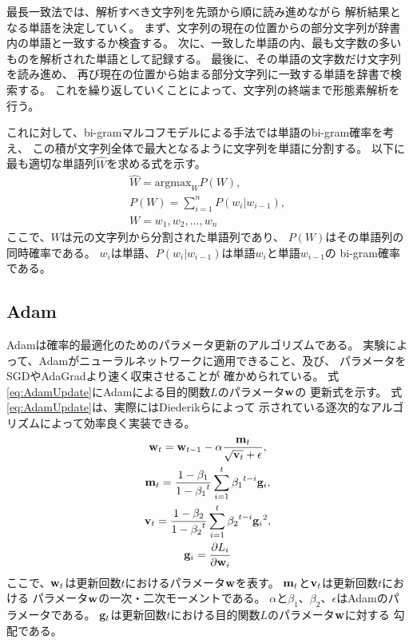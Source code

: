 最長一致法では、解析すべき文字列を先頭から順に読み進めながら
解析結果となる単語を決定していく。
まず、文字列の現在の位置からの部分文字列が辞書内の単語と一致するか検査する。
次に、一致した単語の内、最も文字数の多いものを解析された単語として記録する。
最後に、その単語の文字数だけ文字列を読み進め、
再び現在の位置から始まる部分文字列に一致する単語を辞書で検索する。
これを繰り返していくことによって、文字列の終端まで形態素解析を行う。

これに対して、bi-gramマルコフモデルによる手法では単語のbi-gram確率を考え、
この積が文字列全体で最大となるように文字列を単語に分割する。
以下に最も適切な単語列$\hat{W}$を求める式を示す。
\begin{gather}
  \hat{W} = \text{argmax}_{W} P(W), \\
  P(W) = \sum^{n}_{i = 1} P(w_i | w_{i - 1}), \nonumber \\
  W = w_1, w_2, ... , w_n \nonumber
\end{gather}
ここで、$W$は元の文字列から分割された単語列であり、
$P(W)$はその単語列の同時確率である。
$w_i$は単語、$P(w_i | w_{i - 1})$は単語$w_i$と単語$w_{i - 1}$の
bi-gram確率である。


\subsection{Adam} \label{ssec:Adam}

Adam\cite{diederik15}は確率的最適化のためのパラメータ更新のアルゴリズムである。
実験によって、Adamがニューラルネットワークに適用できること、及び、
パラメータをSGDやAdaGrad\cite{john12}より速く収束させることが
確かめられている。
式\ref{eq:AdamUpdate}にAdamによる目的関数$L$のパラメータ$\mathbf{w}$の
更新式を示す。
式\ref{eq:AdamUpdate}は、実際にはDiederikら\cite{diederik15}によって
示されている逐次的なアルゴリズムによって効率良く実装できる。
\begin{gather} \label{eq:AdamUpdate}
  \mathbf{w}_t = \mathbf{w}_{t - 1}
                 - \alpha \frac{\mathbf{m}_t}
                               {\sqrt{\mathbf{v}_t} + \epsilon}, \\
  \mathbf{m}_t = \frac{1 - \beta_1}{1 - {\beta_1}^t}
                 \sum^t_{i = 1} {\beta_1}^{t - i} \mathbf{g}_i, \nonumber \\
  \mathbf{v}_t = \frac{1 - \beta_2}{1 - {\beta_2}^t}
                 \sum^t_{i = 1} {\beta_2}^{t - i} {\mathbf{g}_i}^2, \nonumber \\
  \mathbf{g}_i = \frac{\partial L_i}{\partial \mathbf{w}_i} \nonumber
\end{gather}
ここで、$\mathbf{w}_t$は更新回数$t$におけるパラメータ$\mathbf{w}$を表す。
$\mathbf{m}_t$と$\mathbf{v}_t$は更新回数$t$における
パラメータ$\mathbf{w}$の一次・二次モーメントである。
$\alpha$と$\beta_1$、$\beta_2$、$\epsilon$はAdamのパラメータである。
$\mathbf{g}_t$は更新回数$t$における目的関数$L$のパラメータ$\mathbf{w}$に対する
勾配である。

